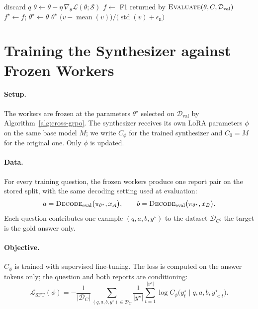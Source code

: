 \documentclass[11pt]{article}
\DeclareMathOperator{\mean}{mean}
\DeclareMathOperator{\stdev}{std}
\begin{document}
\begin{algorithm}[htbp]
\begin{algorithmic}[1]
    \Else
      \State discard $q$ 
    \EndIf
  \EndWhile
  \State $\theta \gets \theta - \eta\, \nabla_\theta \mathcal{L}(\theta; \mathcal{S})$
   
    \State $f \gets$ F1 returned by $\Call{Evaluate}{\theta, C, \mathcal{D}_{\mathrm{val}}}$
      \State $f^\star \gets f$; \; $\theta^\star \gets \theta$
    \EndIf
  \EndIf
\EndFor
\State \Return $\theta^\star$
\Statex
{}
  \State \Return $\big(v - \mean(v)\big) / \big(\stdev(v) + \epsilon_{\mathrm{n}}\big)$
\EndFunction
\end{algorithmic}
\end{algorithm}

\section*{Training the Synthesizer against Frozen Workers}

\paragraph{Setup.}
The workers are frozen at the parameters $\theta^\star$ selected on
$\mathcal{D}_{\mathrm{val}}$ by Algorithm~\ref{alg:cross-grpo}. The
synthesizer receives its own LoRA parameters $\phi$ on the same base model
$M$; we write $C_\phi$ for the trained synthesizer and $C_0 = M$ for the
original one. Only $\phi$ is updated.

\paragraph{Data.}
For every training question, the frozen workers produce one report pair on
the stored split, with the same decoding setting used at evaluation:
\[
  a = \textsc{Decode}_{\mathrm{eval}}\big(\pi_{\theta^\star}, x_A\big),
  \qquad
  b = \textsc{Decode}_{\mathrm{eval}}\big(\pi_{\theta^\star}, x_B\big).
\]
Each question contributes one example $(q, a, b, y^\star)$ to the dataset
$\mathcal{D}_C$; the target is the gold answer only.

\paragraph{Objective.}
$C_\phi$ is trained with supervised fine-tuning. The loss is computed on the
answer tokens only; the question and both reports are conditioning:
\begin{equation}
  \mathcal{L}_{\mathrm{SFT}}(\phi) =
  -\frac{1}{|\mathcal{D}_C|}
  \sum_{(q, a, b, y^\star) \in \mathcal{D}_C}
  \frac{1}{|y^\star|}
  \sum_{t=1}^{|y^\star|}
  \log C_\phi\big(y^\star_t \mid q, a, b, y^\star_{<t}\big).
  \label{eq:sft}
\end{equation}
\end{document}
